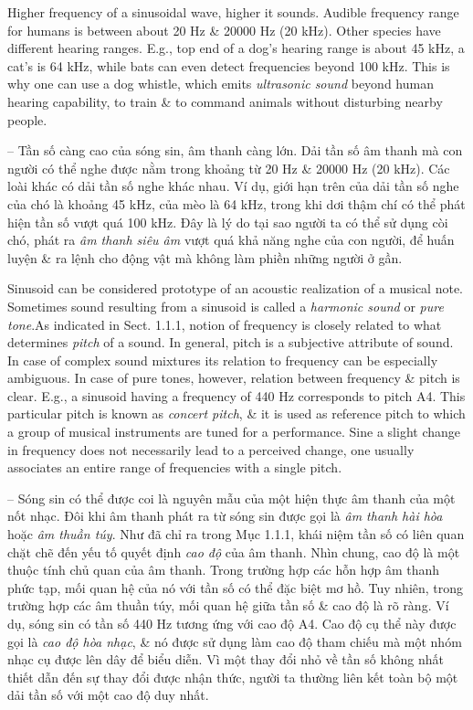 \documentclass{article}
\begin{document}
\begin{itemize}
\begin{itemize}
\begin{itemize}
			Higher frequency of a sinusoidal wave, higher it sounds. Audible frequency range for humans is between about 20 Hz \& 20000 Hz (20 kHz). Other species have different hearing ranges. E.g., top end of a dog's hearing range is about 45 kHz, a cat's is 64 kHz, while bats can even detect frequencies beyond 100 kHz. This is why one can use a dog whistle, which emits {\it ultrasonic sound} beyond human hearing capability, to train \& to command animals without disturbing nearby people.
			
			-- Tần số càng cao của sóng sin, âm thanh càng lớn. Dải tần số âm thanh mà con người có thể nghe được nằm trong khoảng từ 20 Hz \& 20000 Hz (20 kHz). Các loài khác có dải tần số nghe khác nhau. Ví dụ, giới hạn trên của dải tần số nghe của chó là khoảng 45 kHz, của mèo là 64 kHz, trong khi dơi thậm chí có thể phát hiện tần số vượt quá 100 kHz. Đây là lý do tại sao người ta có thể sử dụng còi chó, phát ra {\it âm thanh siêu âm} vượt quá khả năng nghe của con người, để huấn luyện \& ra lệnh cho động vật mà không làm phiền những người ở gần.
			
			Sinusoid can be considered prototype of an acoustic realization of a musical note. Sometimes sound resulting from a sinusoid is called a {\it harmonic sound} or {\it pure tone}.As indicated in Sect. 1.1.1, notion of frequency is closely related to what determines {\it pitch} of a sound. In general, pitch is a subjective attribute of sound. In case of complex sound mixtures its relation to frequency can be especially ambiguous. In case of pure tones, however, relation between frequency \& pitch is clear. E.g., a sinusoid having a frequency of 440 Hz corresponds to pitch A4. This particular pitch is known as {\it concert pitch}, \& it is used as reference pitch to which a group of musical instruments are tuned for a performance. Sine a slight change in frequency does not necessarily lead to a perceived change, one usually associates an entire range of frequencies with a single pitch.
			
			-- Sóng sin có thể được coi là nguyên mẫu của một hiện thực âm thanh của một nốt nhạc. Đôi khi âm thanh phát ra từ sóng sin được gọi là {\it âm thanh hài hòa} hoặc {\it âm thuần túy}. Như đã chỉ ra trong Mục 1.1.1, khái niệm tần số có liên quan chặt chẽ đến yếu tố quyết định {\it cao độ} của âm thanh. Nhìn chung, cao độ là một thuộc tính chủ quan của âm thanh. Trong trường hợp các hỗn hợp âm thanh phức tạp, mối quan hệ của nó với tần số có thể đặc biệt mơ hồ. Tuy nhiên, trong trường hợp các âm thuần túy, mối quan hệ giữa tần số \& cao độ là rõ ràng. Ví dụ, sóng sin có tần số 440 Hz tương ứng với cao độ A4. Cao độ cụ thể này được gọi là {\it cao độ hòa nhạc}, \& nó được sử dụng làm cao độ tham chiếu mà một nhóm nhạc cụ được lên dây để biểu diễn. Vì một thay đổi nhỏ về tần số không nhất thiết dẫn đến sự thay đổi được nhận thức, người ta thường liên kết toàn bộ một dải tần số với một cao độ duy nhất.
			

\end{itemize}
\end{itemize}
\end{itemize}
\end{document}
